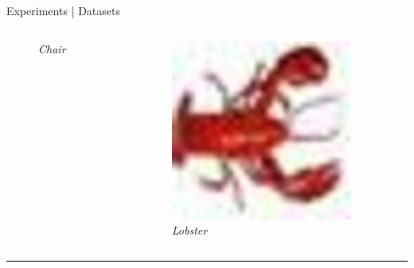 \begin{frame}{Experiments | Datasets}
\begin{columns}
\begin{column}{0.2\textwidth}
\begin{figure}
        \captionsetup{labelformat=empty, justification=centering, font=scriptsize}
        \caption{\emph{Chair}}
      \end{figure}
    \end{column}
    \begin{column}{0.2\textwidth}
      \begin{figure}
        \centering
        \includegraphics[width=.7\linewidth]{figures/04/CIFAR100/example_3.jpg}
        \captionsetup{labelformat=empty, justification=centering, font=scriptsize}
        \caption{\emph{Lobster}}
      \end{figure}
    \end{column}
  \end{columns}

  \rule{\linewidth}{0.4pt}


\end{frame}

